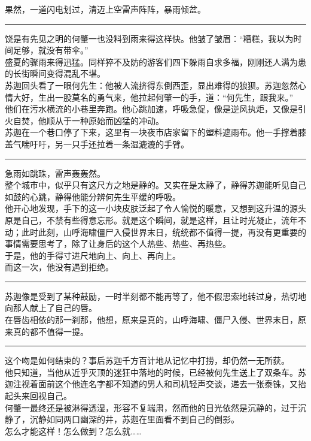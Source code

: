 \documentclass[oneside,11pt]{memoir} %
\begin{document}
\begin{CJK}{UTF8}{gbsn}
    果然，一道闪电划过，清迈上空雷声阵阵，暴雨倾盆。\\\indent
  \rule{-3pt}{30pt}
    饶是有先见之明的何肇一也没料到雨来得这样快。他皱了皱眉：“糟糕，我以为时间足够，就没有带伞。”\\\indent
    盛夏的骤雨来得迅猛。同样猝不及防的游客们四下躲雨自求多福，刚刚还人满为患的长街瞬间变得混乱不堪。\\\indent
    苏迦回头看了一眼何先生：他被人流挤得东倒西歪，显出难得的狼狈。苏迦忽然心情大好，生出一股莫名的勇气来，他拉起何肇一的手，道：“何先生，跟我来。”\\\indent
    他们在污水横流的小巷里奔跑。他心跳加速，呼吸急促，像是逆风执炬，又像是引火自焚，他顺从于一种原始而凶猛的冲动。\\\indent
    苏迦在一个巷口停了下来，这里有一块夜市店家留下的塑料遮雨布。他一手撑着膝盖气喘吁吁，另一只手还拉着一条湿漉漉的手臂。\\\indent
  \rule{-3pt}{30pt}
    急雨如跳珠，雷声轰轰然。\\\indent
    整个城市中，似乎只有这尺方之地是静的。又实在是太静了，静得苏迦能听见自己如鼓的心跳，静得他能分辨何先生平缓的呼吸。\\\indent
    他开心地发现，手下的这一小块皮肤泛起了令人愉悦的暖意，又想到这升温的源头原是自己，不禁有些得意忘形。就是这个瞬间，就是这样，且让时光凝止，流年不动；此时此刻，山呼海啸僵尸入侵世界末日，统统都不值得一提，再没有更重要的事情需要思考了，除了让身后的这个人热些、热些、再热些。\\\indent
    于是，他的手得寸进尺地向上、向上、再向上。\\\indent
    而这一次，他没有遇到拒绝。\\\indent
  \rule{-3pt}{30pt}
    苏迦像是受到了某种鼓励，一时半刻都不能再等了，他不假思索地转过身，热切地向那人献上了自己的唇。\\\indent
    在唇齿相依的那一刹那，他想，原来是真的，山呼海啸、僵尸入侵、世界末日，原来真的都不值得一提。\\\indent
  \rule{-3pt}{30pt}
    这个吻是如何结束的？事后苏迦千方百计地从记忆中打捞，却仍然一无所获。\\\indent
    他只知道，当他从近乎灭顶的迷狂中落地的时候，已经被何先生送上了双条车。苏迦注视着面前这个他连名字都不知道的男人和司机轻声交谈，递去一张泰铢，又抬起头来回视自己。\\\indent
     何肇一最终还是被淋得透湿，形容不复端肃，然而他的目光依然是沉静的，过于沉静了，沉静如同两口幽深的井，苏迦在里面看不到自己的倒影。  \\\indent
    怎么才能这样！怎么做到？怎么就……\\\indent

\end{CJK}
\end{document}
